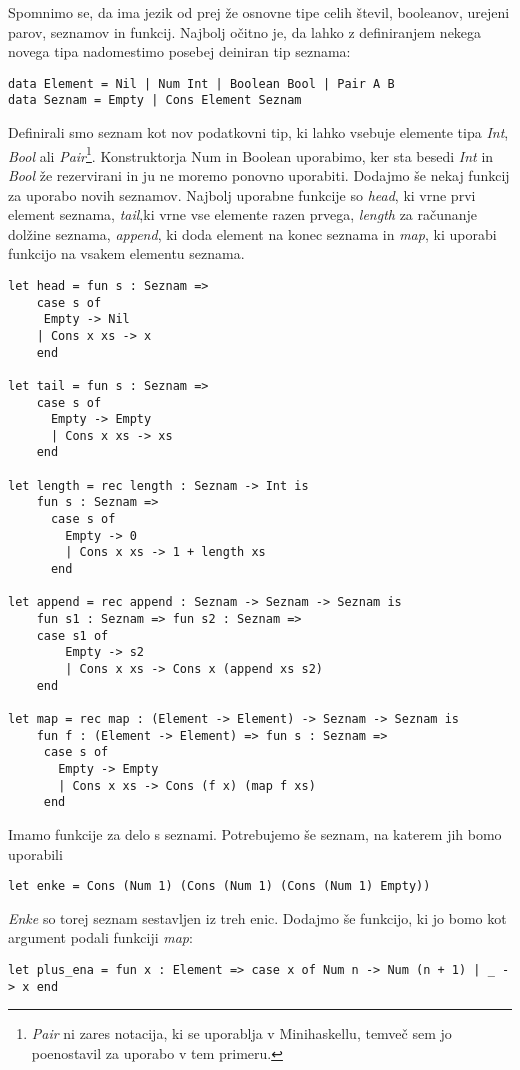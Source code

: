 \documentclass[12pt,a4paper,openany]{book}
\begin{document}
Spomnimo se, da ima jezik od prej že osnovne tipe celih števil, booleanov, urejeni parov, seznamov in funkcij. Najbolj očitno je, da lahko z definiranjem nekega novega tipa nadomestimo posebej 
deiniran tip seznama:
\begin{lstlisting}
data Element = Nil | Num Int | Boolean Bool | Pair A B
data Seznam = Empty | Cons Element Seznam
\end{lstlisting}
Definirali smo seznam kot nov podatkovni tip, ki lahko vsebuje elemente tipa \emph{Int}, \emph{Bool} ali \emph{Pair}\footnote{\emph{Pair} ni zares notacija, ki se uporablja v Minihaskellu, 
temveč sem jo poenostavil za uporabo v tem primeru.}. Konstruktorja Num in Boolean uporabimo, ker sta besedi \emph{Int} in \emph{Bool} že rezervirani in ju ne moremo ponovno uporabiti. Dodajmo 
še nekaj funkcij za uporabo novih seznamov. Najbolj uporabne funkcije so \emph{head}, ki vrne prvi element seznama, \emph{tail},ki vrne vse elemente razen prvega, \emph{length} za računanje 
dolžine seznama, \emph{append}, ki doda element na konec seznama in \emph{map}, ki uporabi funkcijo na vsakem elementu seznama. 
\begin{lstlisting}
let head = fun s : Seznam => 
    case s of
     Empty -> Nil
    | Cons x xs -> x
    end

let tail = fun s : Seznam =>
	case s of
	  Empty -> Empty
	  | Cons x xs -> xs
	end

let length = rec length : Seznam -> Int is
	fun s : Seznam =>
	  case s of
		Empty -> 0
		| Cons x xs -> 1 + length xs
	  end

let append = rec append : Seznam -> Seznam -> Seznam is
	fun s1 : Seznam => fun s2 : Seznam => 
	case s1 of
		Empty -> s2
		| Cons x xs -> Cons x (append xs s2)
	end

let map = rec map : (Element -> Element) -> Seznam -> Seznam is
	fun f : (Element -> Element) => fun s : Seznam =>
	 case s of
	   Empty -> Empty
	   | Cons x xs -> Cons (f x) (map f xs)
	 end
\end{lstlisting}
Imamo funkcije za delo s seznami. Potrebujemo še seznam, na katerem jih bomo uporabili
\begin{lstlisting}
let enke = Cons (Num 1) (Cons (Num 1) (Cons (Num 1) Empty))
\end{lstlisting}
\emph{Enke} so torej seznam sestavljen iz treh enic. Dodajmo še funkcijo, ki jo bomo kot argument podali funkciji \emph{map}:
\begin{lstlisting}
let plus_ena = fun x : Element => case x of Num n -> Num (n + 1) | _ -> x end
\end{lstlisting}
\end{document}
